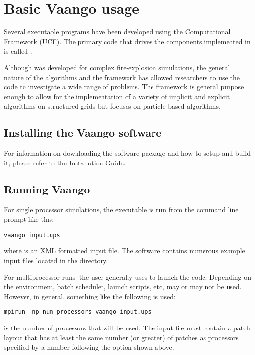 \chapter{Basic Vaango usage} \label{Chapter:UCF}
Several executable programs have been developed using the \Vaango
Computational Framework (UCF).  The primary code that drives the
components implemented in \Vaango is called .

Although \Uintah was developed for complex fire-explosion simulations,
the general nature of the algorithms and the framework has allowed 
researchers to use the code to investigate a
wide range of problems.  The \Vaango framework is general purpose enough to
allow for the implementation of a variety of implicit and explicit
algorithms on structured grids but focuses on particle based
algorithms.

\section{Installing the Vaango software}
For information on downloading the \Vaango software package 
and how to setup and build it, please refer to the \Vaango Installation Guide.

\section{Running Vaango}
For single processor simulations, the  executable
is run from the command line prompt like this:
\begin{lstlisting}[backgroundcolor=\color{background}]
  vaango input.ups
\end{lstlisting}
where  is an XML formatted input file.  The
\Vaango software contains numerous example input files located
in the  directory.

For multiprocessor runs, the user generally uses 
to launch the code.  Depending on the environment, batch
scheduler, launch scripts, etc,  may or may not
be used.  However, in general, something like the following is used:
\begin{lstlisting}[backgroundcolor=\color{background}]
  mpirun -np num_processors vaango input.ups
\end{lstlisting}

 is the number of processors that will
be used.  The input file must contain a patch layout that has at least
the same number (or greater) of patches as processors specified by a
number following the  option shown above.

